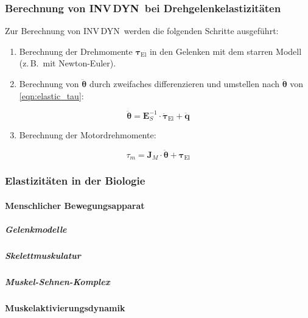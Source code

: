 \documentclass[a4paper, 11pt, accentcolor = tud3b]{tudreport}
\newcommand{\mat}[1]{\boldsymbol{#1}}
\renewcommand{\vec}[1]{\boldsymbol{\mathbf{#1}}}
\newcommand{\zB}{z.\,B.~}
\newcommand{\INVDYN}{INV\,DYN~}
\begin{document}
				\subsubsection{Berechnung von \INVDYN bei Drehgelenkelastizitäten}
					Zur Berechnung von \INVDYN werden die folgenden Schritte ausgeführt:
					\begin{enumerate}
						\item Berechnung der Drehmomente \( \vec{\tau}_\text{El} \) in den Gelenken mit dem starren Modell (\zB mit Newton-Euler).
						\item Berechnung von \( \ddot{\vec{\theta}} \) durch zweifaches differenzieren und umstellen nach \( \ddot{\vec{\theta}} \) von \ref{eqn:elastic_tau}:
					\end{enumerate}
					\begin{equation*}
						\ddot{\vec{\theta}} = \mat{E}_S^{-1} \cdot \ddot{\vec{\tau}}_\text{El} + \ddot{\vec{q}}
					\end{equation*}
					\begin{enumerate}
						\setcounter{enumi}{2}
						\item Berechnung der Motordrehmomente:
					\end{enumerate}
					\begin{equation*}
						\tau_m = \mat{J}_M \cdot \ddot{\vec{\theta}} + \vec{\tau}_\text{El}
					\end{equation*}

				\subsubsection{Elastizitäten in der Biologie} %

					\paragraph{Menschlicher Bewegungsapparat} %

						\subparagraph{Gelenkmodelle} %

						\subparagraph{Skelettmuskulatur} %

						\subparagraph{Muskel-Sehnen-Komplex} %

					\paragraph{Muskelaktivierungsdynamik} %
\end{document}
